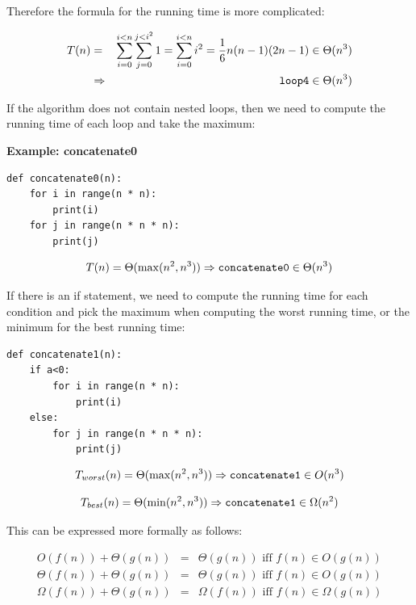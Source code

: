\documentclass[justified, sixbynine]{tufte-book}
\def\subsubsection#1{{\bf #1}}
\theoremstyle{plain}%
\newtheorem * {corollary}{Corollary}
\theoremstyle{definition}
\theoremstyle{remark}
\newtheorem * {remark}{Remark}
\newtheorem * {note}{Note}
\begin{document}
\begin{fullwidth}
Therefore the formula for the running time is more complicated:

\begin{eqnarray}
T(n) &=&\sum_{i=0}^{i<n}\sum_{j=0}^{j<i^2}1=\sum_{i=0}^{i<n}i^2=\frac
16n(n-1)(2n-1)\in \Theta (n^3) \\
&\Rightarrow &\text{{\tt loop4}}\in \Theta (n^3)
\end{eqnarray}

If the algorithm does not contain nested loops, then we need to compute the running time of each loop and take the maximum:

\subsubsection{Example: concatenate0}
\begin{lstlisting}
def concatenate0(n):
    for i in range(n * n):
        print(i)
    for j in range(n * n * n):
        print(j)
\end{lstlisting}

\begin{equation}
T(n)=\Theta (\max (n^2, n^3))\Rightarrow \text{{\tt concatenate0}}\in \Theta
(n^3)
\end{equation}

If there is an if statement, we need to compute the running time for each condition and pick the maximum when computing the worst running time, or the minimum for the best running time:

\begin{lstlisting}
def concatenate1(n):
    if a<0:
        for i in range(n * n):
            print(i)
    else:
        for j in range(n * n * n):
            print(j)
\end{lstlisting}

\begin{equation}
T_{worst}(n)=\Theta (\max (n^2, n^3))\Rightarrow \text{{\tt concatenate1}}\in O(n^3)
\end{equation}

\begin{equation}
T_{best}(n)=\Theta (\min (n^2, n^3))\Rightarrow \text{{\tt concatenate1}}\in \Omega(n^2)
\end{equation}

This can be expressed more formally as follows:

\begin{eqnarray}
O(f(n))+\Theta (g(n)) &=&\Theta (g(n))\text{ iff }f(n)\in O(g(n)) \\
\Theta (f(n))+\Theta (g(n)) &=&\Theta (g(n))\text{ iff }f(n)\in O(g(n)) \\
\Omega (f(n))+\Theta (g(n)) &=&\Omega (f(n))\text{ iff }f(n)\in \Omega (g(n))
\end{eqnarray}


\end{fullwidth}
\end{document}
